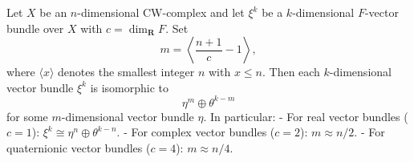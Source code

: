 Let $X$ be an $n$-dimensional CW-complex and let $\xi^k$ be a $k$-dimensional $F$-vector bundle over $X$ with $c = \dim_{\mathbf{R}} F$. Set
$$m = \left\langle \frac{n+1}{c} - 1 \right\rangle,$$
where $\langle x \rangle$ denotes the smallest integer $n$ with $x \leq n$. Then each $k$-dimensional vector bundle $\xi^k$ is isomorphic to
$$\eta^m \oplus \theta^{k-m}$$
for some $m$-dimensional vector bundle $\eta$. In particular:
- For real vector bundles ($c=1$): $\xi^k \cong \eta^n \oplus \theta^{k-n}$.
- For complex vector bundles ($c=2$): $m \approx n/2$.
- For quaternionic vector bundles ($c=4$): $m \approx n/4$.
